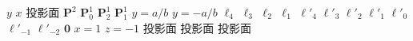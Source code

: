 \documentclass{article} %
\begin{document}
\stopmpxshipout
\mpxshipout%
$y$%
\stopmpxshipout
\mpxshipout%
$x$%
\stopmpxshipout
\mpxshipout%
投影面%
\stopmpxshipout
\mpxshipout%
%
\stopmpxshipout
\mpxshipout%
$\mathbf P^2$%
\stopmpxshipout
\mpxshipout%
$\mathbf P^1_0$%
\stopmpxshipout
\mpxshipout%
$\mathbf P^1_2$%
\stopmpxshipout
\mpxshipout%
$\mathbf P^1_1$%
\stopmpxshipout
\mpxshipout%
$y=a/b$%
\stopmpxshipout
\mpxshipout%
$y=-a/b$%
\stopmpxshipout
\mpxshipout%
$\ell_4$%
\stopmpxshipout
\mpxshipout%
$\ell_3$%
\stopmpxshipout
\mpxshipout%
$\ell_2$%
\stopmpxshipout
\mpxshipout%
$\ell_1$%
\stopmpxshipout
\mpxshipout%
${\ell'}_4$%
\stopmpxshipout
\mpxshipout%
${\ell'}_3$%
\stopmpxshipout
\mpxshipout%
${\ell'}_2$%
\stopmpxshipout
\mpxshipout%
${\ell'}_1$%
\stopmpxshipout
\mpxshipout%
${\ell'}_0$%
\stopmpxshipout
\mpxshipout%
${\ell'}_{-1}$%
\stopmpxshipout
\mpxshipout%
${\ell'}_{-2}$%
\stopmpxshipout
\mpxshipout%
$\mathbf 0$%
\stopmpxshipout
\mpxshipout%
$x=1$%
\stopmpxshipout
\mpxshipout%
$z=-1$%
\stopmpxshipout
\mpxshipout%
投影面%
\stopmpxshipout
\mpxshipout%
投影面%
\stopmpxshipout
\mpxshipout%
投影面%
\stopmpxshipout
\mpxshipout%
%
\stopmpxshipout
\mpxshipout%
%
\stopmpxshipout
\mpxshipout%
$ $%
\stopmpxshipout
\mpxshipout%
$ $%
\stopmpxshipout
\end{document}
